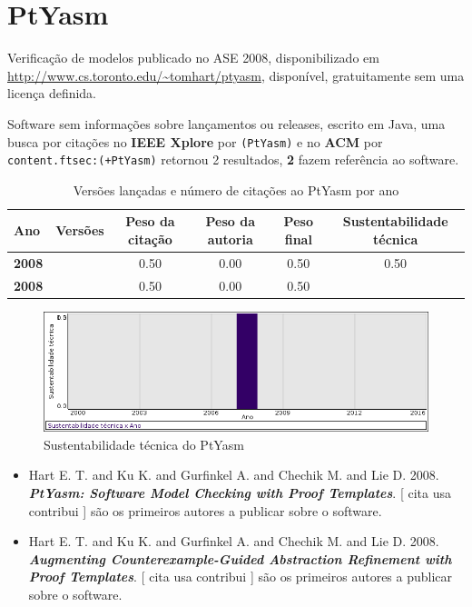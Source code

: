 \section{PtYasm}

Verificação de modelos
publicado no ASE 2008,
disponibilizado em \url{http://www.cs.toronto.edu/~tomhart/ptyasm},
disponível,
gratuitamente
sem uma licença definida.

Software sem informações sobre lançamentos ou releases,
escrito em Java,
uma busca por citações no {\bf IEEE Xplore} por
\texttt{(PtYasm)}
e no {\bf ACM} por
\texttt{content.ftsec:(+PtYasm)}
retornou
2 resultados,
{\bf 2} fazem referência ao software.


\begin{table}[H]
\caption{Versões lançadas e número de citações ao PtYasm por ano}
\centering
\begin{tabular}{| l | c | c | c | c | c |}
  \hline
  Ano & Versões & Peso da citação & Peso da autoria & Peso final & Sustentabilidade técnica \\
  \hline
            {\bf 2008}
          &
          
          &
          0.50
          &
          0.00
          &
          0.50
          &
            {\color{blue} 0.50}
          \\
            {\bf 2008}
          &
          
          &
          0.50
          &
          0.00
          &
          0.50
          &
          \\
\hline
\end{tabular}
\end{table}

\begin{figure}[h]
  \center
  \includegraphics[scale=0.50]{imagens/softwares-charts/ptyasm.png}
  \caption{Sustentabilidade técnica do PtYasm}
\end{figure}


\begin{itemize}
\item Hart E. T. and Ku K. and Gurfinkel A. and Chechik M. and Lie D.
      2008.
        \textbf{\textit{ PtYasm: Software Model Checking with Proof Templates}}.
      [
          cita
          usa
          contribui
      ]
são os primeiros autores a publicar sobre o software.
\item Hart E. T. and Ku K. and Gurfinkel A. and Chechik M. and Lie D.
      2008.
        \textbf{\textit{ Augmenting Counterexample-Guided Abstraction Refinement with Proof Templates}}.
      [
          cita
          usa
          contribui
      ]
são os primeiros autores a publicar sobre o software.
\end{itemize}
